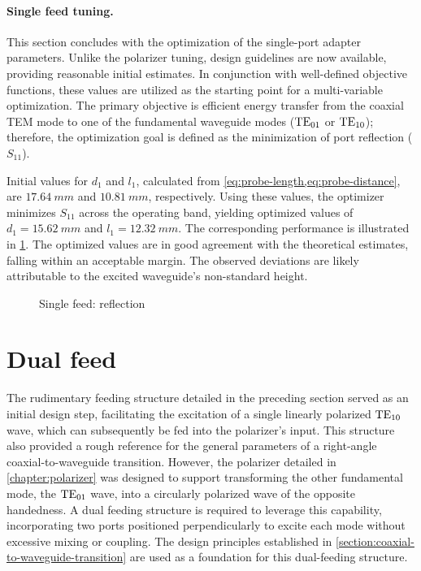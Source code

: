 \documentclass[11pt,a4paper,twoside,openany]{report}
\begin{document}
\paragraph{Single feed tuning.} This section concludes with the optimization of the single-port adapter parameters. Unlike the polarizer tuning, design guidelines are now available, providing reasonable initial estimates. In conjunction with well-defined objective functions, these values are utilized as the starting point for a multi-variable optimization. The primary objective is efficient energy transfer from the coaxial TEM mode to one of the fundamental waveguide modes ($\text{TE}_{01}$ or $\text{TE}_{10}$); therefore, the optimization goal is defined as the minimization of port reflection ($S_{11}$).

Initial values for $d_1$ and $l_1$, calculated from \cref{eq:probe-length,eq:probe-distance}, are $\qty{17.64}{mm}$ and $\qty{10.81}{mm}$, respectively. Using these values, the optimizer minimizes $S_{11}$ across the operating band, yielding optimized values of $d_1 = \qty{15.62}{mm}$ and $l_1 = \qty{12.32}{mm}$. The corresponding performance is illustrated in \cref{fig:single-feed-reflection}. The optimized values are in good agreement with the theoretical estimates, falling within an acceptable margin. The observed deviations are likely attributable to the excited waveguide's non-standard height.

\begin{figure}[!ht]
    \centering
    
    \caption{\label{fig:single-feed-reflection}Single feed: reflection}
\end{figure}

\section{Dual feed}
\label{section:dual-feed}
The rudimentary feeding structure detailed in the preceding section served as an initial design step, facilitating the excitation of a single linearly polarized $\text{TE}_{10}$ wave, which can subsequently be fed into the polarizer's input. This structure also provided a rough reference for the general parameters of a right-angle coaxial-to-waveguide transition. However, the polarizer detailed in \cref{chapter:polarizer} was designed to support transforming the other fundamental mode, the $\text{TE}_{01}$ wave, into a circularly polarized wave of the opposite handedness. A dual feeding structure is required to leverage this capability, incorporating two ports positioned perpendicularly to excite each mode without excessive mixing or coupling. The design principles established in \cref{section:coaxial-to-waveguide-transition} are used as a foundation for this dual-feeding structure.
\end{document}

